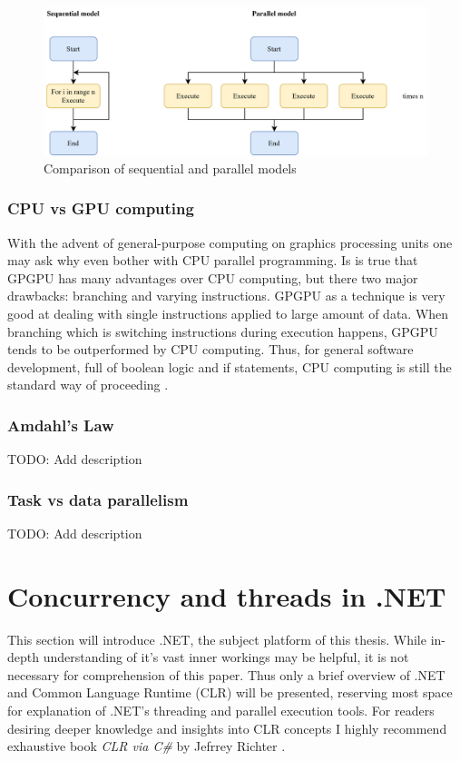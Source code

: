 \begin{figure}[htb]
	\centering
		\includegraphics[scale=1.0]{figures02/seqvspar.png}
		\caption{Comparison of sequential and parallel models}
	\label{fig:seqvspar}
\end{figure}

\subsubsection{CPU vs GPU computing}
With the advent of general-purpose computing on graphics processing units one may ask why even bother with CPU parallel programming. Is is true that GPGPU has many advantages over CPU computing, but there two major drawbacks: branching and varying instructions. GPGPU as a technique is very good at dealing with single instructions applied to large amount of data. When branching which is switching instructions during execution happens, GPGPU tends to be outperformed by CPU computing. Thus, for general software development, full of boolean logic and if statements, CPU computing is still the standard way of proceeding \cite{Tarditi2006}.

\subsubsection{Amdahl's Law}
TODO: Add description

\subsubsection{Task vs data parallelism}
TODO: Add description

\clearpage
\section{Concurrency and threads in .NET}
This section will introduce .NET, the subject platform of this thesis. While in-depth understanding of it's vast inner workings may be helpful, it is not necessary for comprehension of this paper. Thus only a brief overview of .NET and Common Language Runtime (CLR) will be presented, reserving most space for explanation of .NET's threading and parallel execution tools. For readers desiring deeper knowledge and insights into CLR concepts I highly recommend exhaustive book \emph{CLR via C\#} by Jefrrey Richter \cite{richter}.


